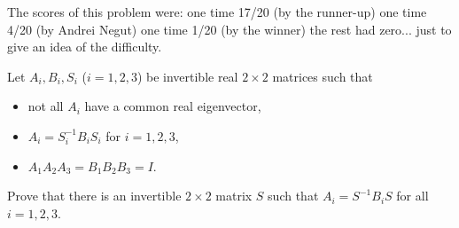 The scores of this problem were:
one time 17/20 (by the runner-up)
one time 4/20 (by Andrei Negut)
one time 1/20 (by the winner)
the rest had zero... just to give an idea of the difficulty.


Let $A_{i},B_{i},S_{i}$ ($i=1,2,3$) be invertible real $2\times 2$ matrices such that
\begin{itemize}
	\item not all $A_{i}$ have a common real eigenvector,
	\item $A_{i}=S_{i}^{-1}B_{i}S_{i}$ for $i=1,2,3$,
	\item $A_{1}A_{2}A_{3}=B_{1}B_{2}B_{3}=I$.
\end{itemize}
Prove that there is an invertible $2\times 2$ matrix $S$ such that $A_{i}=S^{-1}B_{i}S$ for all $i=1,2,3$.